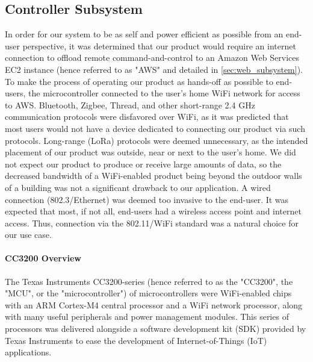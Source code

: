 \subsection{Controller Subsystem}
\label{sec:controller_subsystem}
In order for our system to be as self and power efficient as possible from an end-user perspective, it was determined that our product would require an internet connection to offload remote command-and-control to an Amazon Web Services EC2 instance (hence referred to as "AWS" and detailed in \autoref{sec:web_subsystem}). To make the process of operating our product as hands-off as possible to end-users, the microcontroller connected to the user's home WiFi network for access to AWS. Bluetooth, Zigbee, Thread, and other short-range 2.4 GHz communication protocols were disfavored over WiFi, as it was predicted that most users would not have a device dedicated to connecting our product via such protocols. Long-range (LoRa) protocols were deemed unnecessary, as the intended placement of our product was outside, near or next to the user's home. We did not expect our product to produce or receive large amounts of data, so the decreased bandwidth of a WiFi-enabled product being beyond the outdoor walls of a building was not a significant drawback to our application. A wired connection (802.3/Ethernet) was deemed too invasive to the end-user. It was expected that most, if not all, end-users had a wireless access point and internet access. Thus, connection via the 802.11/WiFi standard was a natural choice for our use case.

\paragraph{CC3200 Overview}
The Texas Instruments CC3200-series (hence referred to as the "CC3200", the "MCU", or the "microcontroller") of microcontrollers were WiFi-enabled chips with an ARM Cortex-M4 central processor and a WiFi network processor, along with many useful peripherals and power management modules. This series of processors was delivered alongside a software development kit (SDK) provided by Texas Instruments to ease the development of Internet-of-Things (IoT) applications.

